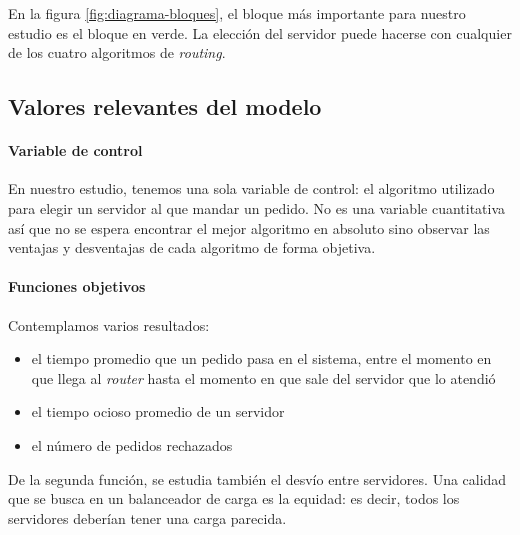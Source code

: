 En la figura \ref{fig:diagrama-bloques}, el bloque más importante para nuestro estudio es el bloque en verde. La
elección del servidor puede hacerse con cualquier de los cuatro algoritmos de \textit{routing}.


\subsection{Valores relevantes del modelo}

\paragraph{Variable de control}
En nuestro estudio, tenemos una sola variable de control: el algoritmo utilizado para elegir un servidor al que mandar
un pedido. No es una variable cuantitativa así que no se espera encontrar el mejor algoritmo en absoluto sino observar
las ventajas y desventajas de cada algoritmo de forma objetiva.

\paragraph{Funciones objetivos}
Contemplamos varios resultados:
\begin{itemize}
    \item el tiempo promedio que un pedido pasa en el sistema, entre el momento en que llega al \textit{router} hasta el
	momento en que sale del servidor que lo atendió
    \item el tiempo ocioso promedio de un servidor
    \item el número de pedidos rechazados
\end{itemize}
De la segunda función, se estudia también el desvío entre servidores. Una calidad que se busca en un balanceador de
carga es la equidad: es decir, todos los servidores deberían tener una carga parecida.

